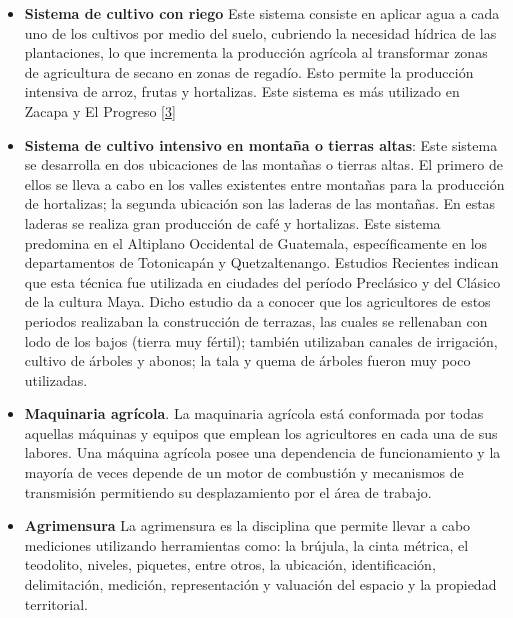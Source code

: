\documentclass[12pt,spanish,Letterpaper,openany]{book}
\begin{document}
\begin{itemize}
\item
  \textbf{Sistema de cultivo con riego} Este sistema consiste en aplicar agua a cada uno de los cultivos por medio del suelo, cubriendo la necesidad hídrica de las plantaciones, lo que incrementa la producción agrícola al transformar zonas de agricultura de secano en zonas de regadío. Esto permite la producción intensiva de arroz, frutas y hortalizas. Este sistema es más utilizado en Zacapa y El Progreso \protect\hyperlink{articulo07_ref03}{{[}3{]}}
\item
  \textbf{Sistema de cultivo intensivo en montaña o tierras altas}: Este sistema se desarrolla en dos ubicaciones de las montañas o tierras altas. El primero de ellos se lleva a cabo en los valles existentes entre montañas para la producción de hortalizas; la segunda ubicación son las laderas de las montañas. En estas laderas se realiza gran producción de café y hortalizas. Este sistema predomina en el Altiplano Occidental de Guatemala, específicamente en los departamentos de Totonicapán y Quetzaltenango. Estudios Recientes indican que esta técnica fue utilizada en ciudades del período Preclásico y del Clásico de la cultura Maya. Dicho estudio da a conocer que los agricultores de estos periodos realizaban la construcción de terrazas, las cuales se rellenaban con lodo de los bajos (tierra muy fértil); también utilizaban canales de irrigación, cultivo de árboles y abonos; la tala y quema de árboles fueron muy poco utilizadas.
\item
  \textbf{Maquinaria agrícola}. La maquinaria agrícola está conformada por todas aquellas máquinas y equipos que emplean los agricultores en cada una de sus labores. Una máquina agrícola posee una dependencia de funcionamiento y la mayoría de veces depende de un motor de combustión y mecanismos de transmisión permitiendo su desplazamiento por el área de trabajo.
\item
  \textbf{Agrimensura} La agrimensura es la disciplina que permite llevar a cabo mediciones utilizando herramientas como: la brújula, la cinta métrica, el teodolito, niveles, piquetes, entre otros, la ubicación, identificación, delimitación, medición, representación y valuación del espacio y la propiedad territorial.
\end{itemize}
\end{document}
